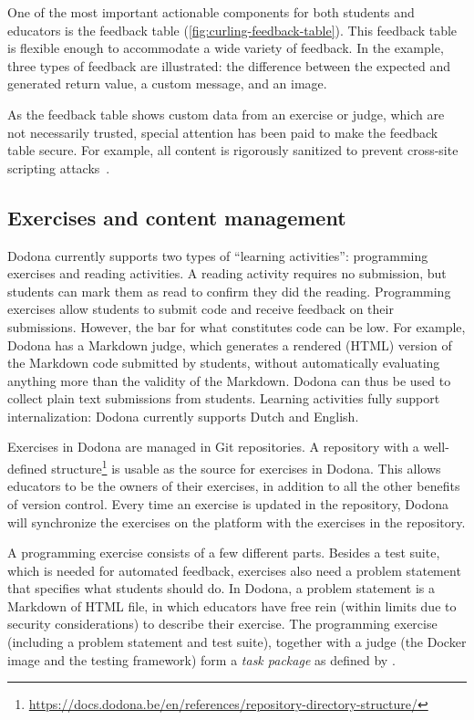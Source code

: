 \documentclass[../main]{subfiles}
\begin{document}
One of the most important actionable components for both students and educators is the feedback table (\cref{fig:curling-feedback-table}).
This feedback table is flexible enough to accommodate a wide variety of feedback.
In the example, three types of feedback are illustrated: the difference between the expected and generated return value, a custom message, and an image.

As the feedback table shows custom data from an exercise or judge, which are not necessarily trusted, special attention has been paid to make the feedback table secure.
For example, all content is rigorously sanitized to prevent cross-site scripting attacks~\autocite{guptaCrossSiteScriptingXSS2017}.

\subsection{Exercises and content management}\label{subsec:exercises-and-content-management}

Dodona currently supports two types of ``learning activities'': programming exercises and reading activities.
A reading activity requires no submission, but students can mark them as read to confirm they did the reading.
Programming exercises allow students to submit code and receive feedback on their submissions.
However, the bar for what constitutes code can be low.
For example, Dodona has a Markdown judge, which generates a rendered (HTML) version of the Markdown code submitted by students, without automatically evaluating anything more than the validity of the Markdown.
Dodona can thus be used to collect plain text submissions from students.
Learning activities fully support internalization: Dodona currently supports Dutch and English.

Exercises in Dodona are managed in Git repositories.
A repository with a well-defined structure\footnote{\url{https://docs.dodona.be/en/references/repository-directory-structure/}} is usable as the source for exercises in Dodona.
This allows educators to be the owners of their exercises, in addition to all the other benefits of version control.
Every time an exercise is updated in the repository, Dodona will synchronize the exercises on the platform with the exercises in the repository.

A programming exercise consists of a few different parts.
Besides a test suite, which is needed for automated feedback, exercises also need a problem statement that specifies what students should do.
In Dodona, a problem statement is a Markdown of HTML file, in which educators have free rein (within limits due to security considerations) to describe their exercise.
The programming exercise (including a problem statement and test suite), together with a judge (the Docker image and the testing framework) form a \emph{task package} as defined by \textcite{verhoeffProgrammingTaskPackages2008}.
\end{document}
